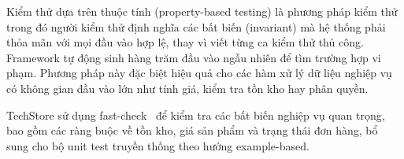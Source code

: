 Kiểm thử dựa trên thuộc tính (property-based testing) là phương pháp kiểm thử trong đó người kiểm thử định nghĩa các bất biến (invariant) mà hệ thống phải thỏa mãn với mọi đầu vào hợp lệ, thay vì viết từng ca kiểm thử thủ công. Framework tự động sinh hàng trăm đầu vào ngẫu nhiên để tìm trường hợp vi phạm. Phương pháp này đặc biệt hiệu quả cho các hàm xử lý dữ liệu nghiệp vụ có không gian đầu vào lớn như tính giá, kiểm tra tồn kho hay phân quyền.

TechStore sử dụng fast-check~\cite{fastcheck_docs} để kiểm tra các bất biến nghiệp vụ quan trọng, bao gồm các ràng buộc về tồn kho, giá sản phẩm và trạng thái đơn hàng, bổ sung cho bộ unit test truyền thống theo hướng example-based.

